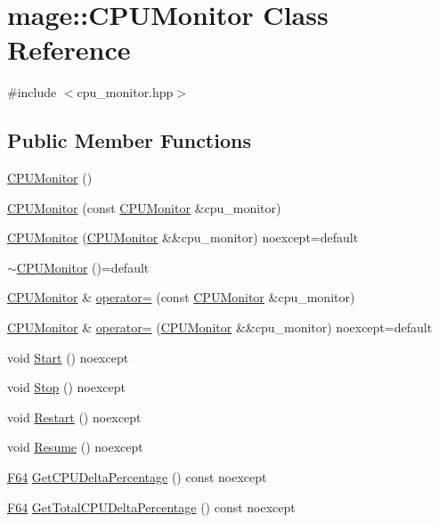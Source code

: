 \hypertarget{classmage_1_1_c_p_u_monitor}{}\section{mage\+:\+:C\+P\+U\+Monitor Class Reference}
\label{classmage_1_1_c_p_u_monitor}


{\ttfamily \#include $<$cpu\+\_\+monitor.\+hpp$>$}

\subsection*{Public Member Functions}
\begin{DoxyCompactItemize}
\item 
\hyperlink{classmage_1_1_c_p_u_monitor_a06f9aa6e78b6659617345784f874dec6}{C\+P\+U\+Monitor} ()
\item 
\hyperlink{classmage_1_1_c_p_u_monitor_a381bdfa95b34c591c6fbdb184e889f88}{C\+P\+U\+Monitor} (const \hyperlink{classmage_1_1_c_p_u_monitor}{C\+P\+U\+Monitor} \&cpu\+\_\+monitor)
\item 
\hyperlink{classmage_1_1_c_p_u_monitor_a415f77c86323428f233f955249f5b252}{C\+P\+U\+Monitor} (\hyperlink{classmage_1_1_c_p_u_monitor}{C\+P\+U\+Monitor} \&\&cpu\+\_\+monitor) noexcept=default
\item 
\hyperlink{classmage_1_1_c_p_u_monitor_a597ea4b27675a22d3d66a1d817b26652}{$\sim$\+C\+P\+U\+Monitor} ()=default
\item 
\hyperlink{classmage_1_1_c_p_u_monitor}{C\+P\+U\+Monitor} \& \hyperlink{classmage_1_1_c_p_u_monitor_a6009df0994652d011a78d1f12013e599}{operator=} (const \hyperlink{classmage_1_1_c_p_u_monitor}{C\+P\+U\+Monitor} \&cpu\+\_\+monitor)
\item 
\hyperlink{classmage_1_1_c_p_u_monitor}{C\+P\+U\+Monitor} \& \hyperlink{classmage_1_1_c_p_u_monitor_af1eacba414b2db72cf13d335f78785cd}{operator=} (\hyperlink{classmage_1_1_c_p_u_monitor}{C\+P\+U\+Monitor} \&\&cpu\+\_\+monitor) noexcept=default
\item 
void \hyperlink{classmage_1_1_c_p_u_monitor_a3f88acbb979f47309fd46f1b507fed09}{Start} () noexcept
\item 
void \hyperlink{classmage_1_1_c_p_u_monitor_a133aaed1df0e84486a6fc748d66615bb}{Stop} () noexcept
\item 
void \hyperlink{classmage_1_1_c_p_u_monitor_ab8b04a64545df631be0f40a54cc49e03}{Restart} () noexcept
\item 
void \hyperlink{classmage_1_1_c_p_u_monitor_a5fd594262dc1073da564955c58851760}{Resume} () noexcept
\item 
\hyperlink{namespacemage_ad26233bbec640deda836e572c1a23708}{F64} \hyperlink{classmage_1_1_c_p_u_monitor_a67a4eba9480d15855f6283ec434c215a}{Get\+C\+P\+U\+Delta\+Percentage} () const noexcept
\item 
\hyperlink{namespacemage_ad26233bbec640deda836e572c1a23708}{F64} \hyperlink{classmage_1_1_c_p_u_monitor_aec7712bcef92b93d368c312168ab56bd}{Get\+Total\+C\+P\+U\+Delta\+Percentage} () const noexcept
\end{DoxyCompactItemize}
